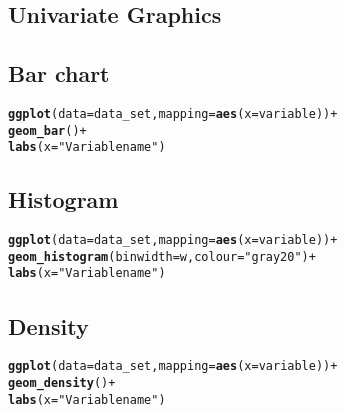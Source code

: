 \documentclass[10pt]{report}\usepackage[]{graphicx}\usepackage[]{color}
\makeatletter
\newcommand{\hlstr}[1]{\textcolor[rgb]{0.192,0.494,0.8}{#1}}%
\newcommand{\hlopt}[1]{\textcolor[rgb]{0,0,0}{#1}}%
\newcommand{\hlstd}[1]{\textcolor[rgb]{0.345,0.345,0.345}{#1}}%
\newcommand{\hlkwc}[1]{\textcolor[rgb]{0.333,0.667,0.333}{#1}}%
\newcommand{\hlkwd}[1]{\textcolor[rgb]{0.737,0.353,0.396}{\textbf{#1}}}%
\newenvironment{kframe}{%
 \def\at@end@of@kframe{}%
 \ifinner\ifhmode%
  \def\at@end@of@kframe{\end{minipage}}%
  \begin{minipage}{\columnwidth}%
 \fi\fi%
 \def\FrameCommand##1{\hskip\@totalleftmargin \hskip-\fboxsep
 \colorbox{shadecolor}{##1}\hskip-\fboxsep
     \hskip-\linewidth \hskip-\@totalleftmargin \hskip\columnwidth}%
 \MakeFramed {\advance\hsize-\width
   \@totalleftmargin\z@ \linewidth\hsize
   \@setminipage}}%
 {\par\unskip\endMakeFramed%
 \at@end@of@kframe}
\newenvironment{knitrout}{}{} %
\makeatother
\begin{document}
\begin{multicols}{2}
\section*{Univariate Graphics}
\subsection*{Bar chart}
\begin{knitrout}\small
{}\color{fgcolor}\begin{kframe}
\begin{alltt}
\hlkwd{ggplot}\hlstd{(}\hlkwc{data} \hlstd{= data_set,} \hlkwc{mapping} \hlstd{=} \hlkwd{aes}\hlstd{(}\hlkwc{x} \hlstd{= variable))} \hlopt{+}
  \hlkwd{geom_bar}\hlstd{()} \hlopt{+}
  \hlkwd{labs}\hlstd{(}\hlkwc{x} \hlstd{=} \hlstr{"Variable name"}\hlstd{)}
\end{alltt}
\end{kframe}
\end{knitrout}
\squeeze
\subsection*{Histogram}
\begin{knitrout}\small
{}\color{fgcolor}\begin{kframe}
\begin{alltt}
\hlkwd{ggplot}\hlstd{(}\hlkwc{data} \hlstd{= data_set,} \hlkwc{mapping} \hlstd{=} \hlkwd{aes}\hlstd{(}\hlkwc{x} \hlstd{= variable))} \hlopt{+}
  \hlkwd{geom_histogram}\hlstd{(}\hlkwc{binwidth} \hlstd{= w,} \hlkwc{colour} \hlstd{=} \hlstr{"gray20"}\hlstd{)} \hlopt{+}
  \hlkwd{labs}\hlstd{(}\hlkwc{x} \hlstd{=} \hlstr{"Variable name"}\hlstd{)}
\end{alltt}
\end{kframe}
\end{knitrout}
\squeeze
\subsection*{Density}
\begin{knitrout}\small
{}\color{fgcolor}\begin{kframe}
\begin{alltt}
\hlkwd{ggplot}\hlstd{(}\hlkwc{data} \hlstd{= data_set,} \hlkwc{mapping} \hlstd{=} \hlkwd{aes}\hlstd{(}\hlkwc{x} \hlstd{= variable))} \hlopt{+}
  \hlkwd{geom_density}\hlstd{()} \hlopt{+}
  \hlkwd{labs}\hlstd{(}\hlkwc{x} \hlstd{=} \hlstr{"Variable name"}\hlstd{)}
\end{alltt}
\end{kframe}
\end{knitrout}
\squeeze

\end{multicols}
\end{document}
